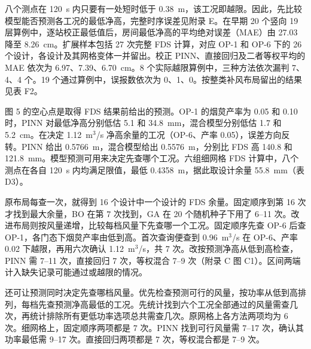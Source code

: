 八个测点在 120~s 内只要有一处短时低于 0.38~m，该工况即越限。因此，先比较模型能否预测各工况的最低净高，完整时序误差见附录 E。在早期 20 个竖向 19 层算例中，逐站校正最低值后，房间最低净高的平均绝对误差（MAE）由 27.03 降至 8.26~cm。扩展样本包括 27 次完整 FDS 计算，对应 OP-1 和 OP-6 下的 26 个设计，各设计及其网格变体一并留出。校正 PINN、直接回归及二者等权平均的 MAE 依次为 6.97、7.39、6.70~cm。8 个实际越限算例中，三种方法依次漏判 7、4、4 个。19 个通过算例中，误报数依次为 0、1、0。按整类补风布局留出的结果见表 F2。

图 5 的空心点是取得 FDS 结果前给出的预测。OP-1 的烟炱产率为 0.05 和 0.10 时，PINN 对最低净高分别低估 5.1 和 34.8~mm，混合模型分别低估 1.7 和 5.2~cm。在决定 1.12~m$^3$/s 净高余量的工况（OP-6、产率 0.05），误差方向反转。PINN 给出 0.5766~m，混合模型给出 0.5576~m，分别比 FDS 高 140.8 和 121.8~mm。模型预测可用来决定先查哪个工况。六组细网格 FDS 计算中，八个测点在各自 120~s 内均满足限值，最低 0.4358~m，据此取设计余量 55.8~mm（表 D3）。

原布局每查一次，就得到 16 个设计中一个设计的 FDS 余量。固定顺序到第 16 次才找到最大余量，BO 在第 7 次找到，GA 在 20 个随机种子下用了 6--11 次。改进布局则按风量递增，比较每档风量下先查哪一个工况。固定顺序先查 OP-6 后查 OP-1，各门态下烟炱产率由低到高。首次查询便查到 0.96~m$^3$/s 在 OP-6、产率 0.02 下越限，再用六次确认 1.12~m$^3$/s，共 7 次。改按预测净高从低到高检查，PINN 需 7--11 次，直接回归 7 次，等权混合 7--9 次（附录 C 图 C1）。区间两端计入缺失记录可能通过或越限的情况。

还可让预测同时决定先查哪档风量。优先检查预测可行的风量，按功率从低到高排列，每档先查预测净高最低的工况。先统计找到六个工况全部通过的风量需查几次，再统计排除所有更低功率选项总共需查几次。原网格上各方法两项均为 6 次。细网格上，固定顺序两项都是 7 次。PINN 找到可行风量需 7--17 次，确认其功率最低需 9--17 次。直接回归两项都是 7 次，等权混合都是 7--9 次。
